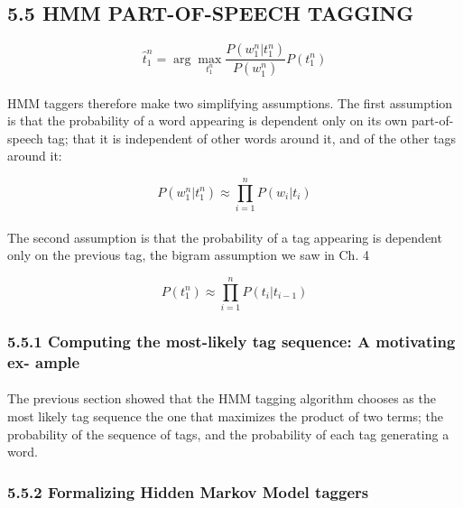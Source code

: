 \documentclass{article}
\begin{document}
	
	\subsection*{5.5 HMM PART-OF-SPEECH TAGGING}
	
	\begin{equation}
		\hat{t}^n_1 = \arg\max_{t^n_1}\frac{P(w_1^n|t_1^n)}{P(w_1^n)}P(t_1^n)
	\end{equation}
	
	\paragraph{}
	HMM taggers therefore make two simplifying assumptions. The first assumption is that the probability of a word appearing is dependent only on its own part-of-speech tag; that it is independent of other words around it, and of the other tags around it:
	
	\begin{equation}
		P(w_1^n|t_1^n) \approx \prod_{i=1}^{n}P(w_i | t_i)
	\end{equation}
	
	\paragraph{}
	The second assumption is that the probability of a tag appearing is dependent only
	on the previous tag, the bigram assumption we saw in Ch. 4
	
	\begin{equation}
		P(t^n_1) \approx \prod_{i=1}^{n}P(t_i | t_{i-1})
	\end{equation}
	
		\subsubsection*{5.5.1 Computing the most-likely tag sequence: A motivating ex- ample}
		
		\paragraph{}
		The previous section showed that the HMM tagging algorithm chooses as the most likely tag sequence the one that maximizes the product of two terms; the probability of the sequence of tags, and the probability of each tag generating a word.
		
		\subsubsection*{5.5.2 Formalizing Hidden Markov Model taggers}
		
\end{document}
